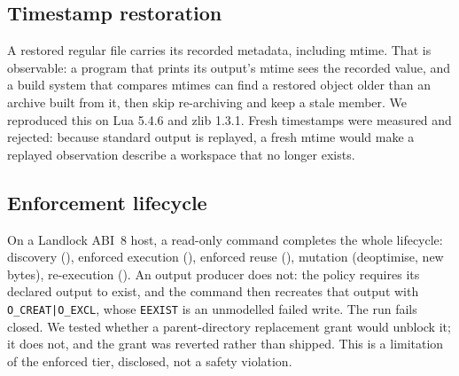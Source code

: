 \subsection{Timestamp restoration}

A restored regular file carries its recorded metadata, including mtime. That is observable: a
program that prints its output's mtime sees the recorded value, and a build system that compares
mtimes can find a restored object older than an archive built from it, then skip re-archiving and
keep a stale member. We reproduced this on Lua 5.4.6 and zlib 1.3.1. Fresh timestamps were
measured and rejected: because standard output is replayed, a fresh mtime would make a replayed
observation describe a workspace that no longer exists.

\subsection{Enforcement lifecycle}

On a Landlock ABI~8 host, a read-only command completes the whole lifecycle: discovery
(\guarded{}), enforced execution (\proven{}), enforced reuse (\proven{}), mutation
(deoptimise, new bytes), re-execution (\proven{}). An output producer does not: the policy requires
its declared output to exist, and the command then recreates that output with
\texttt{O\_CREAT|O\_EXCL}, whose \texttt{EEXIST} is an unmodelled failed write. The run fails
closed. We tested whether a parent-directory replacement grant would unblock it; it does not, and
the grant was reverted rather than shipped. This is a limitation of the enforced tier, disclosed,
not a safety violation.
